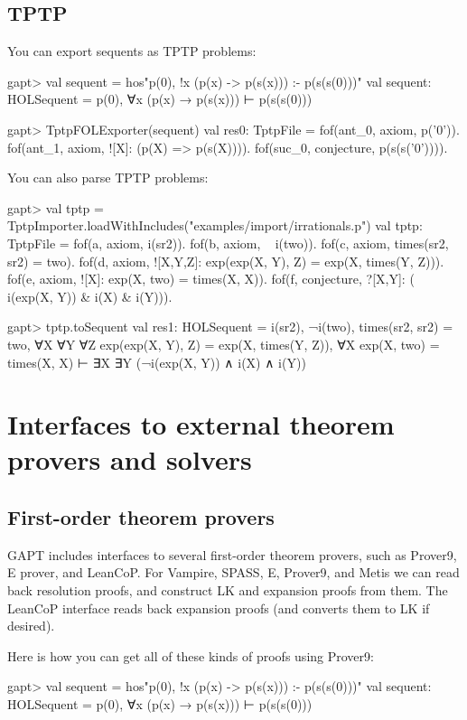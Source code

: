 \documentclass[a4paper,11pt]{book}
\begin{document}
\section{TPTP}
You can export sequents as TPTP problems:
\begin{clilisting}
gapt> val sequent = hos"p(0), !x (p(x) -> p(s(x))) :- p(s(s(0)))"
val sequent: HOLSequent = p(0), ∀x (p(x) → p(s(x))) ⊢ p(s(s(0)))

gapt> TptpFOLExporter(sequent)
val res0: TptpFile = fof(ant_0, axiom, p('0')).
fof(ant_1, axiom, ![X]: (p(X) => p(s(X)))).
fof(suc_0, conjecture, p(s(s('0')))).

\end{clilisting}

You can also parse TPTP problems:
\begin{clilisting}
gapt> val tptp = TptpImporter.loadWithIncludes("examples/import/irrationals.p")
val tptp: TptpFile = fof(a, axiom, i(sr2)).
fof(b, axiom, ~ i(two)).
fof(c, axiom, times(sr2, sr2) = two).
fof(d, axiom, ![X,Y,Z]: exp(exp(X, Y), Z) = exp(X, times(Y, Z))).
fof(e, axiom, ![X]: exp(X, two) = times(X, X)).
fof(f, conjecture, ?[X,Y]: (~ i(exp(X, Y)) & i(X) & i(Y))).

gapt> tptp.toSequent
val res1: HOLSequent = i(sr2),
¬i(two),
times(sr2, sr2) = two,
∀X ∀Y ∀Z exp(exp(X, Y), Z) = exp(X, times(Y, Z)),
∀X exp(X, two) = times(X, X)
⊢
∃X ∃Y (¬i(exp(X, Y)) ∧ i(X) ∧ i(Y))

\end{clilisting}

\chapter{Interfaces to external theorem provers and solvers}


\section{First-order theorem provers}\label{sec:fol_provers}

GAPT includes interfaces to several first-order theorem provers, such as
Prover9, E prover, and LeanCoP.  For Vampire, SPASS, E, Prover9, and Metis we can read back
resolution proofs, and construct LK and expansion proofs from them.  The
LeanCoP interface reads back expansion proofs (and converts them to LK if desired).

Here is how you can get all of these kinds of proofs using Prover9:
\begin{clilisting}
gapt> val sequent = hos"p(0), !x (p(x) -> p(s(x))) :- p(s(s(0)))"
val sequent: HOLSequent = p(0), ∀x (p(x) → p(s(x))) ⊢ p(s(s(0)))

\end{clilisting}
\end{document}
